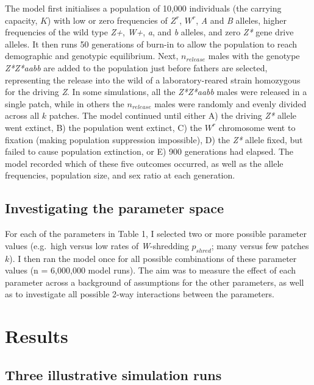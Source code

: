\documentclass[]{rsos}%
\begin{document}
The model first initialises a population of 10,000 individuals (the
carrying capacity, \(K\)) with low or zero frequencies of \(Z^r\),
\(W^r\), \emph{A} and \emph{B} alleles, higher frequencies of the wild
type \emph{Z+}, \emph{W+}, \emph{a}, and \emph{b} alleles, and zero
\emph{Z*} gene drive alleles. It then runs 50 generations of burn-in to
allow the population to reach demographic and genotypic equilibrium.
Next, \(n_{release}\) males with the genotype \emph{Z*Z*aabb} are added
to the population just before fathers are selected, representing the
release into the wild of a laboratory-reared strain homozygous for the
driving \emph{Z}. In some simulations, all the \emph{Z*Z*aabb} males
were released in a single patch, while in others the \(n_{release}\)
males were randomly and evenly divided across all \(k\) patches. The
model continued until either A) the driving \emph{Z*} allele went
extinct, B) the population went extinct, C) the \(W^r\) chromosome went
to fixation (making population suppression impossible), D) the \emph{Z*}
allele fixed, but failed to cause population extinction, or E) 900
generations had elapsed. The model recorded which of these five outcomes
occurred, as well as the allele frequencies, population size, and sex
ratio at each generation.

\hypertarget{investigating-the-parameter-space}{%
\subsection{Investigating the parameter
space}\label{investigating-the-parameter-space}}

For each of the parameters in Table 1, I selected two or more possible
parameter values (e.g.~high versus low rates of \emph{W}-shredding
\(p_{shred}\); many versus few patches \(k\)). I then ran the model once
for all possible combinations of these parameter values (n = 6,000,000
model runs). The aim was to measure the effect of each parameter across
a background of assumptions for the other parameters, as well as to
investigate all possible 2-way interactions between the parameters.

\hypertarget{results}{%
\section{Results}\label{results}}

\hypertarget{three-illustrative-simulation-runs}{%
\subsection{Three illustrative simulation
runs}\label{three-illustrative-simulation-runs}}
\end{document}
